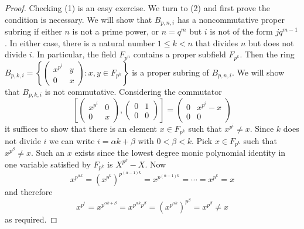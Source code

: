 \documentclass[11pt]{article}
\theoremstyle{definition}
\begin{document}
\begin{proof}
Checking (1) is an easy exercise. We turn to (2) and first prove the condition is necessary. We will show that $B_{p,n,i}$ has a noncommutative proper subring if either $n$ is not a prime power, or $n=q^m$ but $i$ is not of the form $jq^{m-1}$. In either case, there is a natural number $1\leq k<n$ that divides $n$ but does not divide $i$. In particular, the field $F_{p^n}$ contains a proper subfield $F_{p^k}$. Then the ring $B_{p,k,i}=\left\lbrace\begin{pmatrix}
x^{p^i}&y\\
0&x
\end{pmatrix}
:x,y\in F_{p^k}\right\rbrace$ is a proper subring of $B_{p,n,i}$. We will show that $B_{p,k,i}$ is not commutative. Considering the commutator
\[\left[\begin{pmatrix}
x^{p^i}&0\\
0&x
\end{pmatrix},\begin{pmatrix}
0&1\\
0&0
\end{pmatrix}\right]=\begin{pmatrix}
0&x^{p^i}-x\\
0&0
\end{pmatrix}\]
it suffices to show that there is an element $x\in F_{p^k}$ such that $x^{p^i}\neq x$. Since $k$ does not divide $i$ we can write $i=\alpha k+\beta$ with $0<\beta<k$. Pick $x\in F_{p^k}$ such that $x^{p^\beta}\neq x$. Such an $x$ exists since the lowest degree monic polynomial identity in one variable satisfied by $F_{p^k}$ is $X^{p^k}-X$. Now
\[x^{p^{\alpha k}}=\left(x^{p^k}\right)^{p^{(\alpha-1)k}}=x^{p^{(\alpha-1)k}}=\cdots=x^{p^k}=x\]
and therefore
\[x^{p^i}=x^{p^{\alpha k+\beta}}=x^{p^{\alpha k}p^\beta}=\left(x^{p^{\alpha k}}\right)^{p^\beta}=x^{p^\beta}\neq x\]
as required.


\end{proof}
\end{document}
